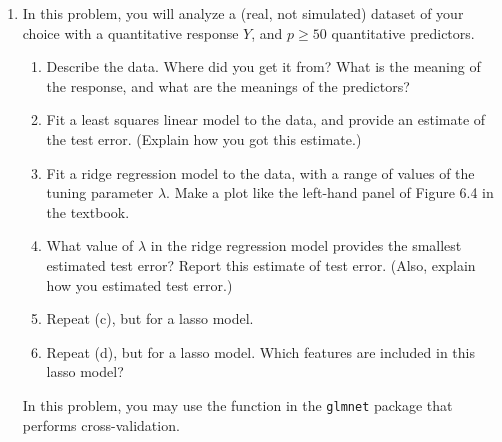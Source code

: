 \documentclass[12pt]{article}
\begin{document}
\begin{enumerate}
\item In this problem, you will analyze a  (real, not simulated) dataset of your choice with a quantitative response $Y$, and $p \geq 50$ quantitative predictors. 
\begin{enumerate}
\item Describe the data. Where did you get it from? What is the meaning of the response, and what are the meanings of the predictors?
\item  Fit a least squares linear model to the data, and provide an estimate of the test error. (Explain how you got this estimate.)
\item Fit a ridge regression model to the data, with a range of values of the tuning parameter $\lambda$. Make a plot like the left-hand panel of Figure 6.4 in the textbook. 
\item What value of $\lambda$ in the ridge regression model provides the smallest estimated test error? Report this estimate of test error. (Also, explain how you estimated test error.)
\item Repeat (c), but for a lasso model.
\item Repeat (d), but for a lasso model.  Which features are included in this lasso model?
\end{enumerate}
In this problem, you may use the function in the \verb=glmnet= package that performs cross-validation. 


 
\end{enumerate}
\end{document}
